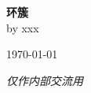 \documentclass[11pt]{book}
\theoremstyle{definition}
\theoremstyle{plain}
\begin{document}
\begin{titlepage}
\setcounter{page}{-1}
\thispagestyle{empty}
	\begin{flushright}
	{\Huge\bfseries 环簇}\\[\baselineskip]
	{by xxx}\par
	\today
	\end{flushright}
	\vfill
	{\Large\itshape 仅作内部交流用}
\end{titlepage}
\clearpage
\thispagestyle{empty}

\frontmatter
\tableofcontents
\mainmatter
	
\backmatter
\printindex
\end{document}
